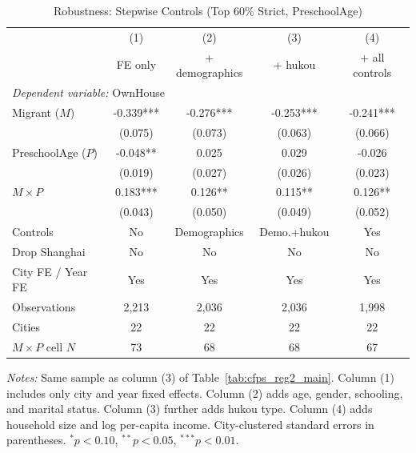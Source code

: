 \begin{table}[htbp]
\centering
\caption{Robustness: Stepwise Controls (Top 60\% Strict, PreschoolAge)}
\label{tab:cfps_reg2_A1}
\begin{threeparttable}
\begin{tabular}{lcccc}
\toprule
 & (1) & (2) & (3) & (4) \\
 & FE only & + demographics & + hukou & + all controls \\
\midrule
\multicolumn{5}{l}{\textit{Dependent variable:} OwnHouse} \\
\midrule
Migrant ($M$) & -0.339*** & -0.276*** & -0.253*** & -0.241*** \\
 & (0.075) & (0.073) & (0.063) & (0.066) \\
PreschoolAge ($P$) & -0.048** & 0.025 & 0.029 & -0.026 \\
 & (0.019) & (0.027) & (0.026) & (0.023) \\
$M \times P$ & 0.183*** & 0.126** & 0.115** & 0.126** \\
 & (0.043) & (0.050) & (0.049) & (0.052) \\
\midrule
Controls & No & Demographics & Demo.+hukou & Yes \\
Drop Shanghai & No & No & No & No \\
City FE / Year FE & Yes & Yes & Yes & Yes \\
Observations & 2,213 & 2,036 & 2,036 & 1,998 \\
Cities & 22 & 22 & 22 & 22 \\
$M \times P$ cell $N$ & 73 & 68 & 68 & 67 \\
\bottomrule
\end{tabular}
\begin{tablenotes}[flushleft]
\footnotesize
\item \textit{Notes:} Same sample as column (3) of Table~\ref{tab:cfps_reg2_main}. Column (1) includes only city and year fixed effects. Column (2) adds age, gender, schooling, and marital status. Column (3) further adds hukou type. Column (4) adds household size and log per-capita income. City-clustered standard errors in parentheses. $^{*}p<0.10$, $^{**}p<0.05$, $^{***}p<0.01$.
\end{tablenotes}
\end{threeparttable}
\end{table}
